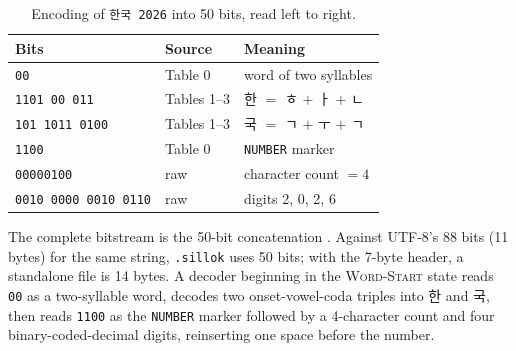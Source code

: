\documentclass[conference]{IEEEtran}
\begin{document}
\begin{table}[H]
\centering
\footnotesize
\caption{Encoding of \texttt{한국 2026} into 50 bits, read left to right.}
\label{tab:example}
\begin{tabular}{lll}
\toprule
Bits & Source & Meaning \\
\midrule
\texttt{00}                 & Table 0 & word of two syllables \\
\texttt{1101\,00\,011}      & Tables 1--3 & 한 $=$ ㅎ $+$ ㅏ $+$ ㄴ \\
\texttt{101\,1011\,0100}    & Tables 1--3 & 국 $=$ ㄱ $+$ ㅜ $+$ ㄱ \\
\texttt{1100}               & Table 0 & \texttt{NUMBER} marker \\
\texttt{00000100}           & raw & character count $= 4$ \\
\texttt{0010\,0000\,0010\,0110} & raw & digits 2, 0, 2, 6 \\
\bottomrule
\end{tabular}
\end{table}

The complete bitstream is the 50-bit concatenation
\texttt{}.
Against UTF-8's 88 bits (11 bytes) for the same string, \texttt{.sillok} uses 50
bits; with the 7-byte header, a standalone file is 14 bytes. A decoder beginning
in the \textsc{Word-Start} state reads \texttt{00} as a two-syllable word,
decodes two onset-vowel-coda triples into 한 and 국, then reads \texttt{1100} as
the \texttt{NUMBER} marker followed by a 4-character count and four
binary-coded-decimal digits, reinserting one space before the number.
\end{document}
